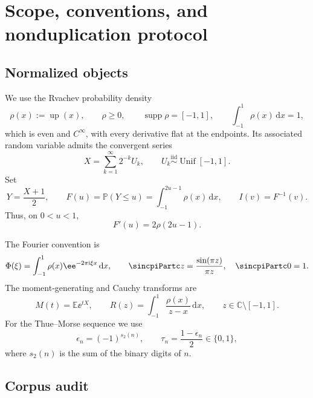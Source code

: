 \documentclass[11pt,oneside]{article}
\theoremstyle{definition}
\newcommand{\dd}{\,\mathrm d}
\newcommand{\ii}{\mathrm i}
\newcommand{\E}{\mathbb E}
\newcommand{\Pp}{\mathbb P}
\newcommand{\Up}{\operatorname{up}}
\begin{document}
\clearpage

\section{Scope, conventions, and nonduplication protocol}
\label{p4:sec:scope}

\subsection{Normalized objects}

We use the Rvachev probability density
\[
 \rho(x):=\Up(x),\qquad \rho\ge0,\qquad
 \operatorname{supp}\rho=[-1,1],\qquad
 \int_{-1}^{1}\rho(x)\dd x=1,
\]
which is even and \(C^\infty\), with every derivative flat at the endpoints. Its associated
random variable admits the convergent series
\begin{equation}
 X=\sum_{k=1}^{\infty}2^{-k}U_k,
 \qquad U_k\stackrel{\mathrm{iid}}{\sim}\operatorname{Unif}[-1,1].
 \label{p4:eq:X-random-series}
\end{equation}
Set
\[
 Y=\frac{X+1}{2},\qquad
 F(u)=\Pp(Y\le u)=\int_{-1}^{2u-1}\rho(x)\dd x,
 \qquad I(v)=F^{-1}(v).
\]
Thus, on \(0<u<1\),
\begin{equation}
 F'(u)=2\rho(2u-1).
 \label{p4:eq:Fprime-rho}
\end{equation}

The Fourier convention is
\begin{equation}
 \Phi(\xi)=\int_{-1}^{1}\rho(x)\ee^{-2\pi\ii\xi x}\dd x,
 \qquad
 \sincpiPartc z=\frac{\sin(\pi z)}{\pi z},\quad \sincpiPartc 0=1.
 \label{p4:eq:fourier-convention}
\end{equation}
The moment-generating and Cauchy transforms are
\begin{equation}
 M(t)=\E\ee^{tX},
 \qquad
 R(z)=\int_{-1}^{1}\frac{\rho(x)}{z-x}\dd x,
 \qquad z\in\mathbb C\setminus[-1,1].
 \label{p4:eq:M-R-defs}
\end{equation}
For the Thue--Morse sequence we use
\begin{equation}
 \epsilon_n=(-1)^{s_2(n)},\qquad
 \tau_n=\frac{1-\epsilon_n}{2}\in\{0,1\},
 \label{p4:eq:TM-conventions}
\end{equation}
where \(s_2(n)\) is the sum of the binary digits of \(n\).

\subsection{Corpus audit}
\end{document}

